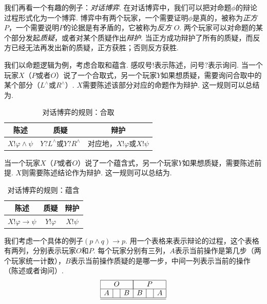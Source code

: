 我们再看一个有趣的例子：\emph{对话博弈}. 在对话博弈中，我们可以把对命题$\phi$的辩论过程形式化为一个博弈. 博弈中有两个玩家，一个需要证明$\phi$是真的，被称为\emph{正方} $P$，一个需要说明$P$的论据是有矛盾的，它被称为\emph{反方} $O$. 两个玩家可以对命题的某个部分发起\emph{质疑}，或者对某个质疑作出\emph{辩护}. 当正方成功辩护了所有的质疑，而反方已经无法再发出新的质疑，正方获胜；否则反方获胜.

我们以命题逻辑为例，考虑合取和蕴含. 感叹号$!$表示陈述，问号$?$表示询问. 当一个玩家$X$（$P$或者$O$）说了一个合取式，另一个玩家$Y$如果想质疑，需要询问合取中的某个部分（$L^\wedge$或$R^\wedge$）. $X$需要陈述该部分对应的命题作为辩护. 这一规则可以总结为.
\begin{table}[ht]
    \centering
    \begin{tabular}{c|c|c}
         陈述&质疑&辩护  \\\hline
         $X!\varphi\wedge\psi$&$Y?L^\wedge$或$Y?R^\wedge$& 对应地，$X!\varphi$或$X!\psi$
    \end{tabular}
    \caption{对话博弈的规则：合取}
    \label{tab:dialogue-game-or}
\end{table}

当一个玩家$X$（$P$或者$O$）说了一个蕴含式，另一个玩家$Y$如果想质疑，需要陈述前提. $X$则需要陈述结论作为辩护. 这一规则可以总结为.
\begin{table}[ht]
    \centering
    \begin{tabular}{c|c|c}
         陈述&质疑&辩护  \\\hline
         $X!\varphi\to\psi$&$Y!\varphi$&$X!\psi$
    \end{tabular}
    \caption{对话博弈的规则：蕴含}
    \label{tab:dialogue-game-impl}
\end{table}

我们考虑一个具体的例子$(p\wedge q)\to p$. 用一个表格来表示辩论的过程，这个表格有两列，分别表示玩家$O$和$P$. 每个玩家分别有三列，$A$表示当前操作是第几步（两个玩家统一计数），$B$表示当前操作质疑的是哪一步，中间一列表示当前的操作（陈述或者询问）.
\[
    \begin{array}{|c|c|c|c|c|c|}
    \hline
        \multicolumn{3}{|c|}{O} & \multicolumn{3}{|c|}{P} \\\hline
        A &  & B & B & & A\\\hline\hline
    \end{array}
\]


